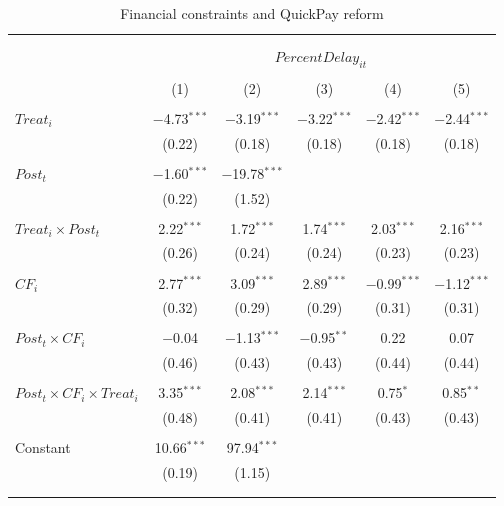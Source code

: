 \documentclass[
]{article}
\begin{document}
\begin{table}[H] \centering 
  \caption{Financial constraints and QuickPay reform} 
  \label{} 
\small 
\begin{tabular}{@{\extracolsep{-2pt}}lccccc} 
\\[-1.8ex]\hline 
\hline \\[-1.8ex] 
\\[-1.8ex] & \multicolumn{5}{c}{$PercentDelay_{it}$  } \\ 
\\[-1.8ex] & (1) & (2) & (3) & (4) & (5)\\ 
\hline \\[-1.8ex] 
 $Treat_i$ & $-$4.73$^{***}$ & $-$3.19$^{***}$ & $-$3.22$^{***}$ & $-$2.42$^{***}$ & $-$2.44$^{***}$ \\ 
  & (0.22) & (0.18) & (0.18) & (0.18) & (0.18) \\ 
  & & & & & \\ 
 $Post_t$ & $-$1.60$^{***}$ & $-$19.78$^{***}$ &  &  &  \\ 
  & (0.22) & (1.52) &  &  &  \\ 
  & & & & & \\ 
 $Treat_i \times Post_t$ & 2.22$^{***}$ & 1.72$^{***}$ & 1.74$^{***}$ & 2.03$^{***}$ & 2.16$^{***}$ \\ 
  & (0.26) & (0.24) & (0.24) & (0.23) & (0.23) \\ 
  & & & & & \\ 
 $CF_i$ & 2.77$^{***}$ & 3.09$^{***}$ & 2.89$^{***}$ & $-$0.99$^{***}$ & $-$1.12$^{***}$ \\ 
  & (0.32) & (0.29) & (0.29) & (0.31) & (0.31) \\ 
  & & & & & \\ 
 $Post_t \times CF_i$ & $-$0.04 & $-$1.13$^{***}$ & $-$0.95$^{**}$ & 0.22 & 0.07 \\ 
  & (0.46) & (0.43) & (0.43) & (0.44) & (0.44) \\ 
  & & & & & \\ 
 $Post_t \times CF_i \times Treat_i$ & 3.35$^{***}$ & 2.08$^{***}$ & 2.14$^{***}$ & 0.75$^{*}$ & 0.85$^{**}$ \\ 
  & (0.48) & (0.41) & (0.41) & (0.43) & (0.43) \\ 
  & & & & & \\ 
 Constant & 10.66$^{***}$ & 97.94$^{***}$ &  &  &  \\ 
  & (0.19) & (1.15) &  &  &  \\ 
  & & & & & \\ 
\hline \\[-1.8ex] 

\end{tabular}
\end{table}
\end{document}
